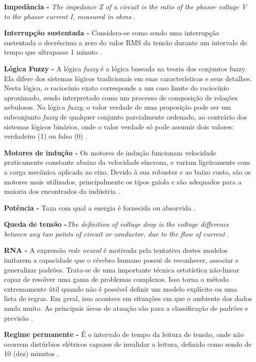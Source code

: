 \noindent
\textbf{Impedância -} \textit{The impedance Z of a circuit is the ratio of the phasor voltage V to the phasor current I, measured in ohms} \citep{SAD03}.

\noindent
\textbf{Interrupção sustentada -} Considera-se como sendo uma interrupção sustentada o decréscimo a zero do valor RMS da tensão durante um intervalo de tempo que ultrapasse 1 minuto \citep{JUN09}.

\noindent
\textbf{Lógica Fuzzy -} A lógica \textit{fuzzy} é a lógica baseada na teoria dos conjuntos fuzzy. Ela difere dos sistemas lógicos tradicionais em suas características e seus detalhes. Nesta lógica, o raciocínio exato corresponde a um caso limite do raciocínio aproximado, sendo  interpretado como um processo de composição de relações  nebulosas.  Na lógica \textit{fuzzy}, o valor verdade de uma proposição pode ser um subconjunto \textit{fuzzy} de qualquer conjunto parcialmente ordenado, ao contrário dos sistemas lógicos binários, onde o valor verdade só pode assumir dois valores: verdadeiro (1) ou falso (0) \citep{GOM94}. 

\noindent
\textbf{Motores de indução -} Os motores de indução funcionam velocidade praticamente constante abaixo da velocidade síncrona, e variam ligeiramente com a carga mecânica aplicada ao eixo. Devido à sua robustez e ao baixo custo, são os motores mais utilizados, principalmente os tipos gaiola e são adequados para a maioria dos encontrados da indústria \citep{COR05}. 

\noindent
\textbf{Potência -} Taxa com qual a energia é fornecida ou absorvida \citep{DOR08}.

\noindent
\textbf{Queda de tensão -}\textit{The definition of voltage drop is the voltage difference between any two points of circuit or conductor, due to the flow of current} \citep{LOC08}.

\noindent
\textbf{RNA -} A expressão \textit{rede neural} é motivada pela tentativa destes modelos imitarem a capacidade que o cérebro humano possui de reconhecer, associar e generalizar padrões. Trata-se de uma importante técnica estatística não-linear capaz de resolver uma gama de problemas complexos. Isso torna o método extremamente útil quando não é possível definir um modelo explícito ou uma lista de regras. Em geral, isso acontece em situações em que o ambiente dos dados muda muito. As principais áreas de atuação são para a classificação de padrões e previsão \citep{VEL07}.

\noindent
\textbf{Regime permanente -} É o intervalo de tempo da leitura de tensão, onde não ocorrem distúrbios elétricos capazes de invalidar a leitura, definido como sendo de 10 (dez) minutos \citep{ANE01}.

